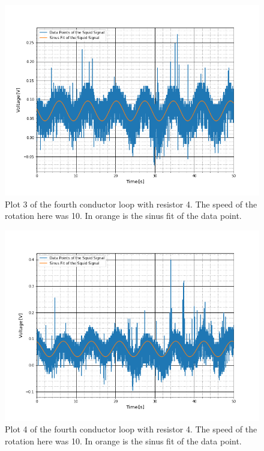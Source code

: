 \begin{figure}[ht]
	\includegraphics[scale=0.5]{Bild/r4_10_1}
	\centering
	\caption[Plot of fourth conductor loop 3]{Plot 3 of the fourth conductor loop with resistor 4. The speed of the rotation here was 10. In orange is the sinus fit of the data point.}
\end{figure}
\begin{figure}[ht]
	\includegraphics[scale=0.5]{Bild/r4_10_2}
	\centering
	\caption[Plot of fourth conductor loop 4]{Plot 4 of the fourth conductor loop with resistor 4. The speed of the rotation here was 10. In orange is the sinus fit of the data point.}
\end{figure}
